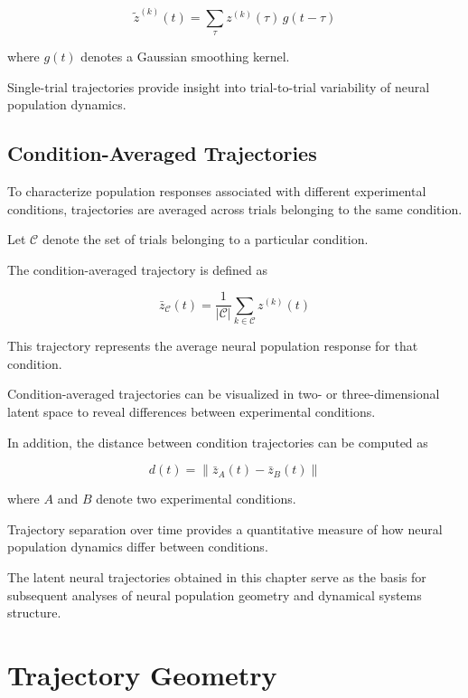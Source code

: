 \documentclass[11pt]{report}
\begin{document}
\begin{equation}
\tilde{z}^{(k)}(t) =
\sum_{\tau} z^{(k)}(\tau)
\, g(t-\tau)
\end{equation}

where $g(t)$ denotes a Gaussian smoothing kernel.

Single-trial trajectories provide insight into trial-to-trial
variability of neural population dynamics.

\section{Condition-Averaged Trajectories}

To characterize population responses associated with different
experimental conditions, trajectories are averaged across trials
belonging to the same condition.

Let $\mathcal{C}$ denote the set of trials belonging to a particular
condition.

The condition-averaged trajectory is defined as

\begin{equation}
\bar{z}_{\mathcal{C}}(t) =
\frac{1}{|\mathcal{C}|}
\sum_{k \in \mathcal{C}}
z^{(k)}(t)
\end{equation}

This trajectory represents the average neural population response
for that condition.

Condition-averaged trajectories can be visualized in two- or
three-dimensional latent space to reveal differences between
experimental conditions.

In addition, the distance between condition trajectories can be
computed as

\begin{equation}
d(t) =
\left\|
\bar{z}_{A}(t) - \bar{z}_{B}(t)
\right\|
\end{equation}

where $A$ and $B$ denote two experimental conditions.

Trajectory separation over time provides a quantitative measure of
how neural population dynamics differ between conditions.

The latent neural trajectories obtained in this chapter serve as the
basis for subsequent analyses of neural population geometry and
dynamical systems structure.


\chapter{Trajectory Geometry}
\end{document}
